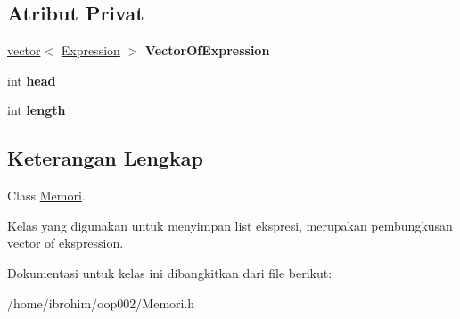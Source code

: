 \subsection*{Atribut Privat}
\begin{DoxyCompactItemize}
\item 
\hypertarget{classMemori_a65dc4365b196005ba293855ae0c71fcb}{}\hyperlink{classvector}{vector}$<$ \hyperlink{classExpression}{Expression} $>$ {\bfseries Vector\+Of\+Expression}\label{classMemori_a65dc4365b196005ba293855ae0c71fcb}

\item 
\hypertarget{classMemori_a9748fa465fa9736b8de83d724e578f62}{}int {\bfseries head}\label{classMemori_a9748fa465fa9736b8de83d724e578f62}

\item 
\hypertarget{classMemori_a2f10008f6293c4542deab9eb0217f202}{}int {\bfseries length}\label{classMemori_a2f10008f6293c4542deab9eb0217f202}

\end{DoxyCompactItemize}


\subsection{Keterangan Lengkap}
Class \hyperlink{classMemori}{Memori}. 

Kelas yang digunakan untuk menyimpan list ekspresi, merupakan pembungkusan vector of ekspression. 

Dokumentasi untuk kelas ini dibangkitkan dari file berikut\+:\begin{DoxyCompactItemize}
\item 
/home/ibrohim/oop002/Memori.\+h\end{DoxyCompactItemize}
